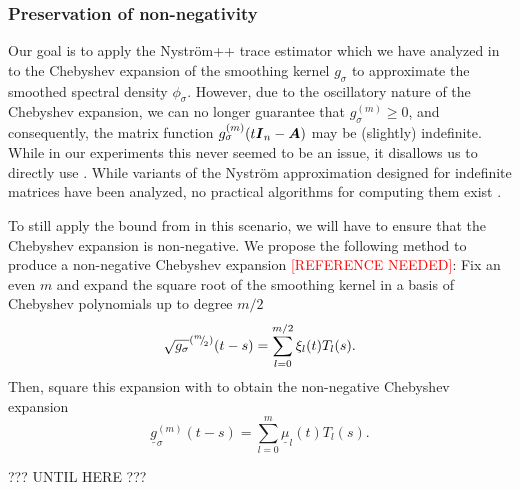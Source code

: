 \subsubsection{Preservation of non-negativity}

Our goal is to apply the Nyström++ trace estimator which we have analyzed in  to the Chebyshev expansion of the smoothing kernel $g_{\sigma}$ to approximate the smoothed spectral density $\phi_{\sigma}$. However, due to the oscillatory nature of the Chebyshev expansion, we can no longer guarantee that $g_{\sigma}^{(m)} \geq 0$, and consequently, the matrix function $g_{\sigma}^{(m)}(t \boldsymbol{I}_n - \boldsymbol{A})$ may be (slightly) indefinite. While in our experiments this never seemed to be an issue, it disallows us to directly use . While variants of the Nyström approximation designed for indefinite matrices have been analyzed, no practical algorithms for computing them exist \cite{nakatsukasa-2023-randomized-lowrank}.

To still apply the bound from  in this scenario, we will have to ensure that the Chebyshev expansion is non-negative. We propose the following method to produce a non-negative Chebyshev expansion \textcolor{red}{[REFERENCE NEEDED]}: Fix an even $m$ and expand the square root of the smoothing kernel in a basis of Chebyshev polynomials up to degree $m/2$
\begin{equation}
    \sqrt{g_{\sigma}}^{({}^{m}{\mskip -5mu/\mskip -3mu}_{2})}(t - s) = \sum_{l=0}^{m/2} \xi_l(t) T_l(s).
    \label{equ:square-root-chebyshev-expansion}
\end{equation}
Then, square this expansion with  to obtain the non-negative Chebyshev expansion
\begin{equation}
    \underline{g}_{\sigma}^{(m)}(t - s) = \sum_{l=0}^{m} \underline{\mu}_l(t) T_l(s).
    \label{equ:non-negative-chebyshev-expansion}
\end{equation}

??? UNTIL HERE ???


\color{black}


